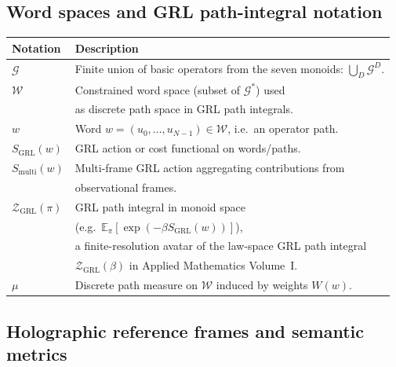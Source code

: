 \documentclass[11pt]{book}
\theoremstyle{plain}
\theoremstyle{definition}
\theoremstyle{remark}
\begin{document}
\subsection*{Word spaces and GRL path-integral notation}

\begin{center}
\begin{tabular}{ll}
\hline
Notation & Description \\
\hline
$\mathcal{G}$ & Finite union of basic operators from the seven monoids:
               $\bigcup_{D} \mathcal{G}^{D}$. \\
$\mathcal{W}$ & Constrained word space (subset of $\mathcal{G}^{*}$) used \\
              & as discrete path space in GRL path integrals. \\
$w$           & Word $w = (u_{0},\dots,u_{N-1}) \in \mathcal{W}$, i.e.\ an operator path. \\
$S_{\mathrm{GRL}}(w)$ & GRL action or cost functional on words/paths. \\
$S_{\mathrm{multi}}(w)$ & Multi-frame GRL action aggregating contributions from \\
  & observational frames. \\
$\mathcal{Z}_{\mathrm{GRL}}(\pi)$
  & GRL path integral in monoid space \\
  & (e.g.\ $\mathbb{E}_{\pi}[\exp(-\beta S_{\mathrm{GRL}}(w))]$), \\
  & a finite-resolution avatar of the law-space GRL path integral \\
  & $\mathcal{Z}_{\mathrm{GRL}}(\beta)$ in Applied Mathematics
    Volume~I. \\
$\mu$         & Discrete path measure on $\mathcal{W}$ induced by weights $W(w)$. \\
\hline
\end{tabular}
\end{center}

\subsection*{Holographic reference frames and semantic metrics}
\end{document}
